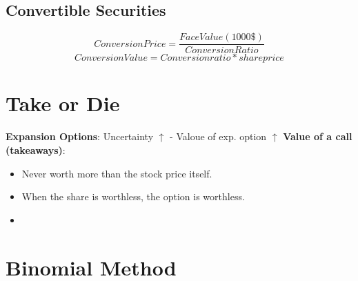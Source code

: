 \documentclass{cheatsheet}
\begin{document}
\subsection{Convertible Securities}
\[Conversion Price = \frac{Face Value (1000\$)}{Conversion Ratio}\]
\[Conversion Value = Conversion ratio * share price\]
\section{Take or Die}
\textbf{Expansion Options}: Uncertainty $\uparrow$ - Valoue of exp. option $\uparrow$
\textbf{Value of a call (takeaways)}: 
\begin{itemize}
  \item Never worth more than the stock price itself.
  \item When the share is worthless, the option is worthless.
  \item 
\end{itemize}

\section*{Binomial Method}
\end{document}
